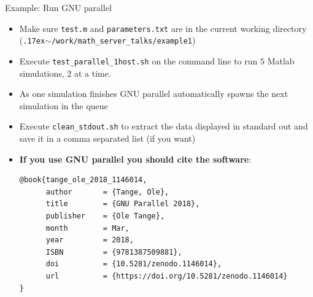 \documentclass{beamer}
\begin{document}
\begin{frame}[fragile]{Example: Run GNU parallel}
\begin{itemize}
	\item Make sure \texttt{test.m} and \texttt{parameters.txt} are in the current working directory (\texttt{{\raise.17ex\hbox{$\scriptstyle\mathtt{\sim}$}}/work/math\_server\_talks/example1})
	\item Execute \texttt{test\_parallel\_1host.sh} on the command line to run $5$ Matlab simulations, $2$ at a time.
	\item As one simulation finishes GNU parallel automatically spawns the next simulation in the queue
	\item Execute \texttt{clean\_stdout.sh} to extract the data displayed in standard out and save it in a comma separated list (if you want)
\item \textbf{If you use GNU parallel you should cite the software}:
\tiny
\begin{verbatim}
@book{tange_ole_2018_1146014,
      author       = {Tange, Ole},
      title        = {GNU Parallel 2018},
      publisher    = {Ole Tange},
      month        = Mar,
      year         = 2018,
      ISBN         = {9781387509881},
      doi          = {10.5281/zenodo.1146014},
      url          = {https://doi.org/10.5281/zenodo.1146014}
}
\end{verbatim}
\end{itemize}
\end{frame}

\end{document}
